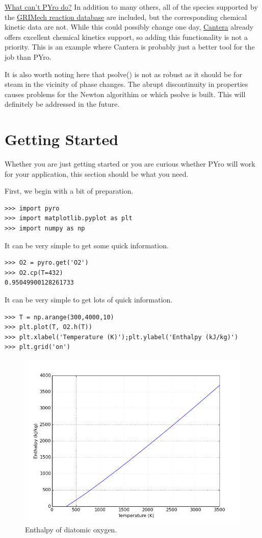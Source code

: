 \underline{What can't PYro do?}  In addition to many others, all of the species supported by the \href{http://combustion.berkeley.edu/gri-mech/}{GRIMech reaction database} are included, but the corresponding chemical kinetic data are not.  While this could possibly change one day, \href{http://cantera.github.io/docs/sphinx/html/index.html}{Cantera} already offers excellent chemical kinetics support, so adding this functionality is not a priority.  This is an example where Cantera is probably just a better tool for the job than PYro.

It is also worth noting here that psolve() is not as robust as it should be for steam in the vicinity of phase changes.  The abrupt discontinuity in properties causes problems for the Newton algorithim or which psolve is built.  This will definitely be addressed in the future.

\section{Getting Started}\label{sec:start}
Whether you are just getting started or you are curious whether PYro will work for your application, this section should be what you need.

First, we begin with a bit of preparation.
\begin{verbatim}
>>> import pyro
>>> import matplotlib.pyplot as plt
>>> import numpy as np
\end{verbatim}

It can be very simple to get some quick information.
\begin{verbatim}
>>> O2 = pyro.get('O2')
>>> O2.cp(T=432)
0.95049900128261733
\end{verbatim}

It can be very simple to get lots of quick information.
\begin{verbatim}
>>> T = np.arange(300,4000,10)
>>> plt.plot(T, O2.h(T))
>>> plt.xlabel('Temperature (K)');plt.ylabel('Enthalpy (kJ/kg)')
>>> plt.grid('on')
\end{verbatim}

\begin{figure}[h!]
\begin{center}
\includegraphics[width=.75\linewidth]{fig/o2h}
\caption{Enthalpy of diatomic oxygen.}
\end{center}
\end{figure}

